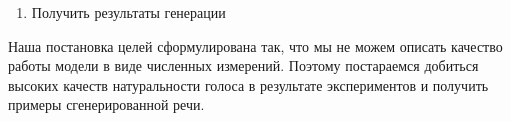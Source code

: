 \documentclass[../diploma.tex]{subfiles}
\begin{document}
\begin{enumerate}[resume]
    \item Получить результаты генерации
\end{enumerate}

Наша постановка целей сформулирована так, что мы не можем описать качество работы модели в виде численных измерений.
Поэтому постараемся добиться высоких качеств натуральности голоса в результате экспериментов и получить примеры сгенерированной речи.

\end{document}
